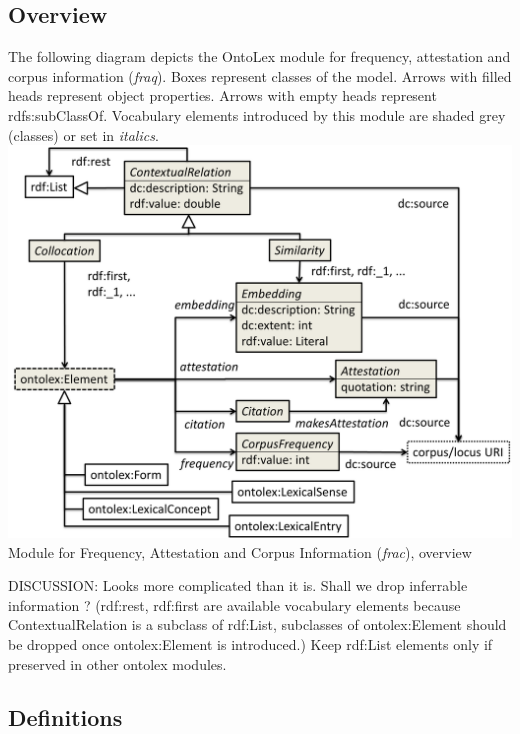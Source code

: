 \documentclass[a4paper]{article}
\begin{document}
\subsection{Overview}
The following diagram depicts the OntoLex module for frequency, attestation and corpus information (\textit{fraq}). Boxes represent classes of the model. Arrows with filled heads represent object properties. Arrows with empty heads represent rdfs:subClassOf. Vocabulary elements introduced by this module are shaded grey (classes) or set in \textit{italics}.%
%
%
  \includegraphics{index-img/index-img002.png} Module for Frequency, Attestation and Corpus Information (\textit{frac}), overview 

DISCUSSION: Looks more complicated than it is. Shall we drop inferrable information ? (rdf:rest, rdf:first are available vocabulary elements because ContextualRelation is a subclass of rdf:List, subclasses of ontolex:Element should be dropped once ontolex:Element is introduced.) Keep rdf:List elements only if preserved in other ontolex modules. 

\subsection{Definitions}
\end{document}
